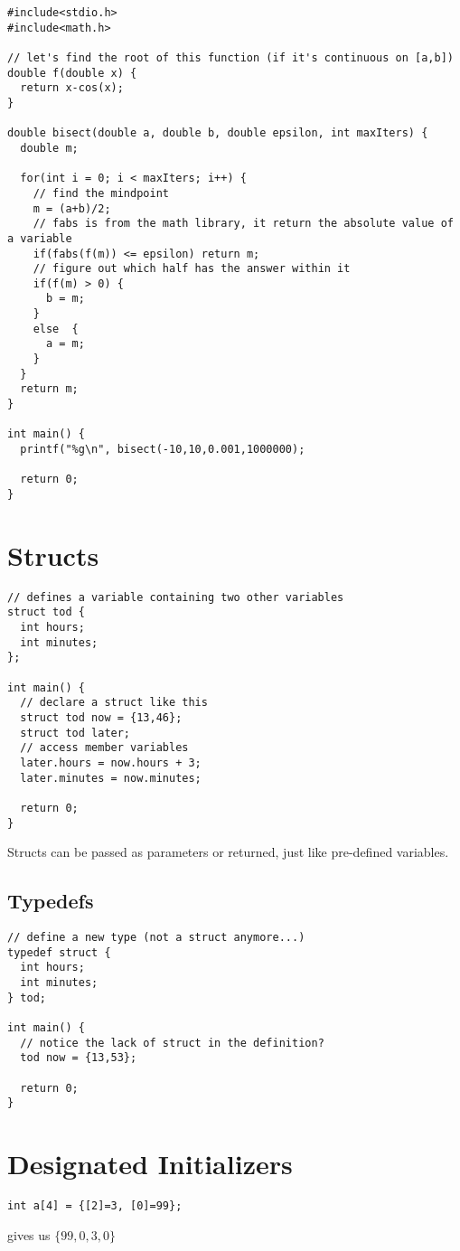 \documentclass[12pt]{article}
\begin{document}
\begin{verbatim}
#include<stdio.h>
#include<math.h>

// let's find the root of this function (if it's continuous on [a,b])
double f(double x) {
  return x-cos(x);
}

double bisect(double a, double b, double epsilon, int maxIters) {
  double m;

  for(int i = 0; i < maxIters; i++) {
    // find the mindpoint
    m = (a+b)/2;
    // fabs is from the math library, it return the absolute value of a variable
    if(fabs(f(m)) <= epsilon) return m;
    // figure out which half has the answer within it
    if(f(m) > 0) {
      b = m;
    }
    else  {
      a = m;
    }
  }
  return m;
}

int main() {
  printf("%g\n", bisect(-10,10,0.001,1000000);

  return 0;
}
\end{verbatim}

\section*{Structs}
\begin{verbatim}
// defines a variable containing two other variables
struct tod {
  int hours;
  int minutes;
};

int main() {
  // declare a struct like this
  struct tod now = {13,46};
  struct tod later;
  // access member variables
  later.hours = now.hours + 3;
  later.minutes = now.minutes;

  return 0;
}
\end{verbatim}
Structs can be passed as parameters or returned, just like pre-defined variables.

\subsection*{Typedefs}
\begin{verbatim}
// define a new type (not a struct anymore...)
typedef struct {
  int hours;
  int minutes;
} tod;

int main() {
  // notice the lack of struct in the definition?
  tod now = {13,53};

  return 0;
}
\end{verbatim}

\section*{Designated Initializers}
\begin{verbatim}int a[4] = {[2]=3, [0]=99};\end{verbatim} gives us $\{99,0,3,0\}$
\end{document}
